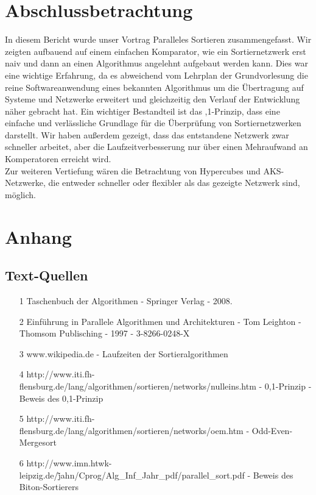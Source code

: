 \documentclass[11pt,ngerman]{article}
\begin{document}
\section{Abschlussbetrachtung}
In diesem Bericht wurde unser Vortrag \grqq Paralleles Sortieren\grqq{} zusammengefasst. Wir zeigten aufbauend auf einem einfachen Komparator, wie ein Sortiernetzwerk erst naiv und dann an einen Algorithmus angelehnt aufgebaut werden kann. Dies war eine wichtige Erfahrung, da es abweichend vom Lehrplan der Grundvorlesung die reine Softwareanwendung eines bekannten Algorithmus um die Übertragung auf Systeme und Netzwerke erweitert und gleichzeitig den Verlauf der Entwicklung näher gebracht hat. Ein wichtiger Bestandteil ist das ,1\glqq -Prinzip, dass eine einfache und verlässliche Grundlage für die Überprüfung von Sortiernetzwerken darstellt. Wir haben außerdem gezeigt, dass das entstandene Netzwerk zwar schneller arbeitet, aber die Laufzeitverbesserung nur über einen Mehraufwand an Komperatoren erreicht wird.\\ Zur weiteren Vertiefung wären die Betrachtung von Hypercubes und AKS-Netzwerke, die entweder schneller oder flexibler als das gezeigte Netzwerk sind, möglich.
 
\section{Anhang}
\subsection{Text-Quellen}
\begin{enumerate}
\item[1] Taschenbuch der Algorithmen - Springer Verlag - 2008.
    
\item[2] Einführung in Parallele Algorithmen und Architekturen - Tom Leighton - Thomsom Publisching - 1997 - 3-8266-0248-X
    
\item[3] www.wikipedia.de - Laufzeiten der Sortieralgorithmen

\item[4] http://www.iti.fh-flensburg.de/lang/algorithmen/sortieren/networks/nulleins.htm - 0,1-Prinzip - Beweis des 0,1-Prinzip

\item[5] http://www.iti.fh-flensburg.de/lang/algorithmen/sortieren/networks/oem.htm - Odd-Even-Mergesort

\item[6] http://www.imn.htwk-leipzig.de/\~jahn/Cprog/Alg\_Inf\_Jahr\_pdf/parallel\_sort.pdf - Beweis des Biton-Sortierers
\end{enumerate}
\end{document}
